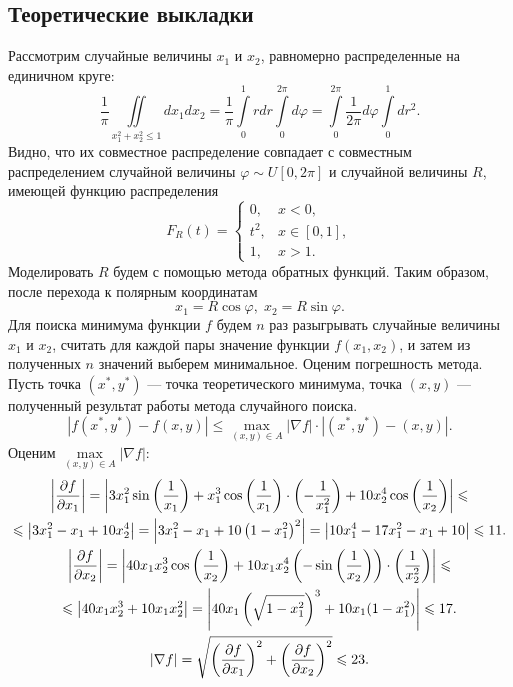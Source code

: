 \documentclass[11pt]{article}
\newcommand\abs[1]{\left\lvert#1\right\rvert}
\begin{document}
\subsection{Теоретические выкладки}
Рассмотрим случайные величины $x_1$ и $x_2$, равномерно распределенные на единичном круге:
$$
\frac{1}{\pi} \iint\limits_{x_1^2 + x_2^2 \leqslant 1} dx_1 dx_2 = \frac{1}{\pi} \int\limits_0^1 r dr \int\limits_0^{2\pi} d\varphi = \int\limits_0^{2\pi} \frac{1}{2\pi} d\varphi \int\limits_0^1 dr^2.
$$
Видно, что их совместное распределение совпадает с совместным распределением случайной величины $\varphi \sim U[0, 2\pi]$ и случайной величины $R$, имеющей функцию распределения
$$
F_R(t) = \begin{cases}
0, & x < 0, \\
t^2, & x \in [0, 1], \\
1, & x > 1.
\end{cases}
$$
Моделировать $R$ будем с помощью метода обратных функций. Таким образом, после перехода к полярным координатам
$$
x_1 = R \cos \varphi, \; x_2 = R \sin \varphi.
$$
Для поиска минимума функции $f$ будем $n$ раз разыгрывать случайные величины $x_1$ и $x_2$, считать для каждой пары значение функции $f(x_1, x_2)$, и затем из полученных $n$ значений выберем минимальное. Оценим погрешность метода. Пусть точка $(x^*, y^*)$ --- точка теоретического минимума, точка $(x, y)$ --- полученный результат работы метода случайного поиска.
$$
\abs{f(x^*, y^*) - f(x, y)} \leqslant \max\limits_{(x, y) \in A} \abs{\nabla f} \cdot \abs{(x^*, y^*) - (x, y)}.
$$
Оценим $\max\limits_{(x, y) \in A} \abs{\nabla f}$:
\begin{gather}
\abs{\frac{\partial f}{\partial x_1}} = \abs{3x_1^2 \sin \left( \frac{1}{x_1} \right) + x_1^3 \cos \left( \frac{1}{x_1} \right) \cdot \left( -\frac{1}{x_1^2} \right) + 10 x_2^4 \cos \left( \frac{1}{x_2} \right)} \leqslant \notag \\
\leqslant \abs{3x_1^2 - x_1 + 10x_2^4} = \abs{3x_1^2 - x_1 + 10\left( 1 - x_1^2 \right)^2} = \abs{10x_1^4 - 17x_1^2 - x_1 + 10} \leqslant 11. \notag \\
\abs{\frac{\partial f}{\partial x_2}} = \abs{40x_1 x_2^3 \cos \left( \frac{1}{x_2} \right) + 10x_1 x_2^4 \left( -\sin \left( \frac{1}{x_2} \right) \right) \cdot \left( \frac{1}{x_2^2} \right)} \leqslant \notag \\
\leqslant \abs{40x_1 x_2^3 + 10x_1 x_2^2} = \abs{40x_1 \left( \sqrt{1 - x_1^2} \right)^3 + 10x_1(1 - x_1^2)} \leqslant 17. \notag \\
\abs{\nabla f} = \sqrt{\left( \frac{\partial f}{\partial x_1} \right)^2 + \left( \frac{\partial f}{\partial x_2} \right)^2} \leqslant 23. \notag
\end{gather}
\end{document}
